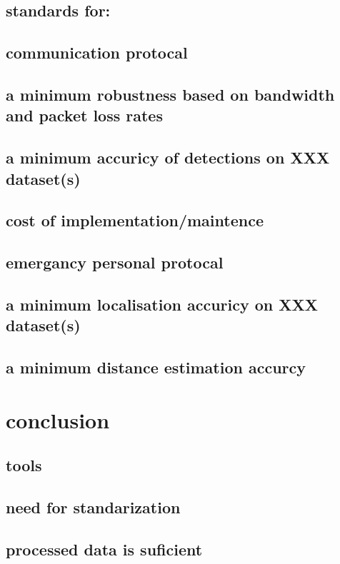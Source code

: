 \documentclass[conference]{IEEEtran}
\begin{document}
\subsection{standards for:}
\subsection{communication protocal}
\subsection{a minimum robustness based on bandwidth and packet loss rates}
\subsection{a minimum accuricy of detections on XXX dataset(s)}
\subsection{cost of implementation/maintence}
\subsection{emergancy personal protocal}
\subsection{a minimum localisation accuricy on XXX dataset(s)}
\subsection{a minimum distance estimation accurcy}

\section{conclusion}
\subsection{tools}
\subsection{need for standarization}
\subsection{processed data is suficient}
\end{document}
